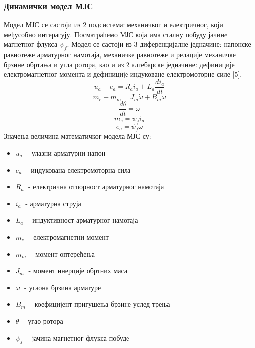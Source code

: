 \documentclass[12pt]{article}
\begin{document}
\subsubsection{Динамички модел МЈС}
Модел МЈС се састоји из 2 подсистема: механичког и електричног, који међусобно интерагују. Посматраћемо МЈС која има сталну побуду јачинe магнетног флукса $\psi _f$. Модел се састоји из 3 диференцијалне једначине: напонске равнотеже арматурног намотаја, механичке равнотеже и релације механичке брзине обртања и угла ротора, као и из 2 алгебарске једначине: дефиниције електромагнетног момента и дефиниције индуковане електромоторне силе [5].
\begin{equation}
    u_a-e_a=R_ai_a+L_a\dfrac{di_a}{dt}
\end{equation}
\begin{equation}
    m_e-m_m=J_m \dot\omega+B_m\omega
\end{equation}
\begin{equation}
    \dfrac{d\theta}{dt}=\omega
\end{equation}
\begin{equation}
    m_e=\psi _fi_a
\end{equation}
\begin{equation}
    e_a=\psi _f\omega
\end{equation}
\newpage
Значења величина математичког модела МЈС су:
\begin{itemize}
    \item $u_a\;$ - улазни арматурни напон
    \item $e_a\;$ - индукована електромоторна сила
    \item $R_a\;$ - електрична отпорност арматурног намотаја
    \item $i_a\;$ - арматурна струја
    \item $L_a\;$ - индуктивност арматурног намотаја
    \item $m_e\;$ - електромагнетни момент
    \item $m_m\;$ - момент оптерећења
    \item $J_m\;$ - момент инерције обртних маса
    \item $\omega\;$ - угаона брзина арматуре
    \item $B_m\;$ - коефицијент пригушења брзине услед трења
    \item $\theta\;$ - угао ротора
    \item $\psi _f\;$ - јачина магнетног флукса побуде
\end{itemize}
\end{document}

